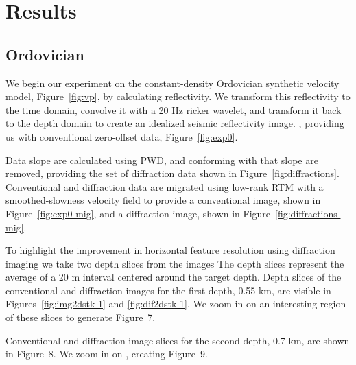 \section{Results}
\subsection{Ordovician}

We begin our experiment on the constant-density Ordovician synthetic velocity model, Figure~\ref{fig:vp}, by calculating reflectivity.  We transform this reflectivity to the time domain, convolve it with a 20 Hz ricker wavelet, and transform it back to the depth domain to create an idealized seismic reflectivity image.   \cite[]{fomel2013}, providing us with conventional zero-offset data, Figure~\ref{fig:exp0}.
\par
Data slope are calculated using PWD, and  conforming with that slope are removed, providing the set of diffraction data shown in Figure~\ref{fig:diffractions}.  Conventional and diffraction data are migrated using low-rank RTM with a smoothed-slowness velocity field to provide a conventional image, shown in Figure~\ref{fig:exp0-mig}, and a diffraction image, shown in Figure~\ref{fig:diffractions-mig}.
\par
To highlight the improvement in horizontal feature resolution using diffraction imaging we take two depth slices from the images  The depth slices represent the average of a 20 m interval centered around the target depth.  Depth slices of the conventional and diffraction images for the first depth, 0.55 km, are visible in Figures~\ref{fig:img2dstk-1} and \ref{fig:dif2dstk-1}.  We zoom in on an interesting region of these slices to generate Figure~7.
\par
Conventional and diffraction image slices for the second depth, 0.7 km, are shown in Figure~8.  We zoom in on , creating Figure~9.

